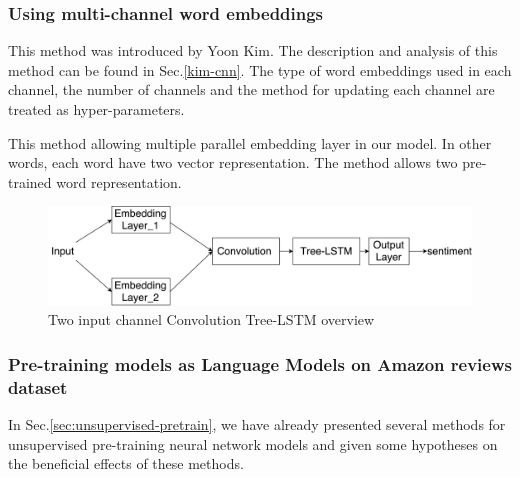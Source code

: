 \subsubsection{Using multi-channel word embeddings}\label{sec:enhan-multi-channel}
This method was introduced by Yoon Kim\cite{KimCNN}.
The description and analysis of this method can be found in Sec.\ref{kim-cnn}.
The type of word embeddings used in each channel, the number of channels and the method for updating each channel are treated as hyper-parameters.

This method allowing multiple parallel embedding layer in our model. 
In other words, each word have two vector representation. 
The method allows two pre-trained word representation. 

\begin{figure}[H]
    \centering
    \includegraphics[width=0.8\linewidth]{figure/multichannelcnnlstm}
    \caption[Convolution Tree-LSTM overview]{Two input channel Convolution Tree-LSTM overview}
    \label{fig:multichannelcnnlstm}
\end{figure}


\subsubsection{Pre-training models as Language Models on Amazon reviews dataset}
In Sec.\ref{sec:unsupervised-pretrain}, we have already presented several methods for unsupervised pre-training neural network models and given some hypotheses on the beneficial effects of these methods.
